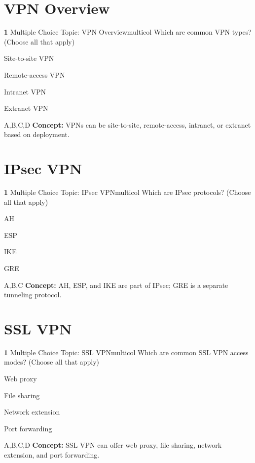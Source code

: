\documentclass[10pt,a4paper]{article}
\begin{document}
\section{VPN Overview}
\begin{qcard}{\color{white}\textbf{1} \hfill \small Multiple Choice \textbar{} Topic: VPN Overview}{multicol}
Which are common VPN types? (Choose all that apply)

\begin{qoptions}
\item Site-to-site VPN
\item Remote-access VPN
\item Intranet VPN
\item Extranet VPN
\end{qoptions}
\begin{explainbox}{A,B,C,D}
\textbf{Concept:} VPNs can be site-to-site, remote-access, intranet, or extranet based on deployment.
\end{explainbox}
\end{qcard}

\section{IPsec VPN}
\begin{qcard}{\color{white}\textbf{1} \hfill \small Multiple Choice \textbar{} Topic: IPsec VPN}{multicol}
Which are IPsec protocols? (Choose all that apply)

\begin{qoptions}
\item AH
\item ESP
\item IKE
\item GRE
\end{qoptions}
\begin{explainbox}{A,B,C}
\textbf{Concept:} AH, ESP, and IKE are part of IPsec; GRE is a separate tunneling protocol.
\end{explainbox}
\end{qcard}

\section{SSL VPN}
\begin{qcard}{\color{white}\textbf{1} \hfill \small Multiple Choice \textbar{} Topic: SSL VPN}{multicol}
Which are common SSL VPN access modes? (Choose all that apply)

\begin{qoptions}
\item Web proxy
\item File sharing
\item Network extension
\item Port forwarding
\end{qoptions}
\begin{explainbox}{A,B,C,D}
\textbf{Concept:} SSL VPN can offer web proxy, file sharing, network extension, and port forwarding.
\end{explainbox}
\end{qcard}
\end{document}
